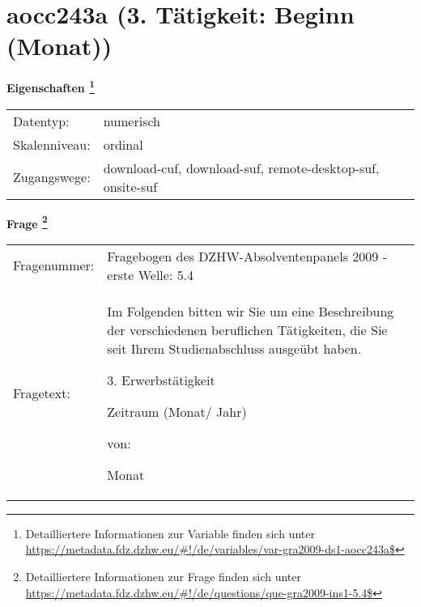 
    \setcounter{footnote}{0}

    \vspace*{-1.8cm}
	\section{aocc243a (3. Tätigkeit: Beginn (Monat))}
	\label{section:aocc243a}



    \vspace*{0.5cm}
    \noindent\textbf{Eigenschaften
	\footnote{Detailliertere Informationen zur Variable finden sich unter
		\url{https://metadata.fdz.dzhw.eu/\#!/de/variables/var-gra2009-ds1-aocc243a$}}}\\
	\begin{tabularx}{\hsize}{@{}lX}
	Datentyp: & numerisch \\
	Skalenniveau: & ordinal \\
	Zugangswege: &
	  download-cuf, 
	  download-suf, 
	  remote-desktop-suf, 
	  onsite-suf
 \\
    \end{tabularx}



				\vspace*{0.5cm}
                \noindent\textbf{Frage
	                \footnote{Detailliertere Informationen zur Frage finden sich unter
		              \url{https://metadata.fdz.dzhw.eu/\#!/de/questions/que-gra2009-ins1-5.4$}}}\\
				\begin{tabularx}{\hsize}{@{}lX}
					Fragenummer: &
					  Fragebogen des DZHW-Absolventenpanels 2009 - erste Welle:
					  5.4
 \\
					Fragetext: & Im Folgenden bitten wir Sie um eine Beschreibung der verschiedenen beruflichen Tätigkeiten, die Sie seit Ihrem Studienabschluss ausgeübt haben.\par  3. Erwerbstätigkeit\par  Zeitraum (Monat/ Jahr)\par  von:\par  Monat \\
				\end{tabularx}





